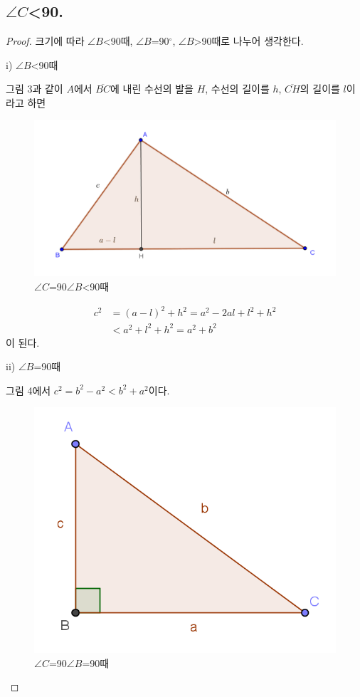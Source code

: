 \documentclass{article}
\newcommand{\C}{\ensuremath{\angle C}}
\newcommand{\bb}{\ensuremath{\angle B}}
\newcommand{\D}{\ensuremath{{}^\circ}}
\newcommand{\PPP}{\ensuremath{a^2+b^2>c^2}}
\begin{document}
\subsection{\C<90 .}
\begin{proof}
 크기에 따라 \bb<90 때, \bb=90\D, \bb>90 때로 나누어 생각한다.

i) \bb<90 때

그림 3과 같이 \(A\)에서 \(\overline{BC}\)에 내린 수선의 발을 \(H\), 수선의 길이를 \(h\), \(\overline{CH}\)의 길이를 \(l\)이라고 하면
\begin{figure}[h]
\center
\includegraphics{3_1}
\caption{\C=90 \bb<90 때}
\end{figure}
\begin{align*}
c^2
&=(a-l)^2+h^2=a^2-2al+l^2+h^2\\
&<a^2+l^2+h^2=a^2+b^2
\end{align*}
이 된다.

ii) \bb=90 때

그림 4에서
\(c^2=b^2-a^2<b^2+a^2\)이다.
\begin{figure}[h]
\center
\includegraphics{3_2}
\caption{\C=90 \bb=90 때}
\end{figure}


\end{proof}
\end{document}
